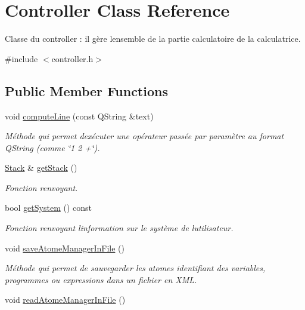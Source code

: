 \hypertarget{class_controller}{}\section{Controller Class Reference}
\label{class_controller}


Classe du controller \+: il gère l\textquotesingle{}ensemble de la partie calculatoire de la calculatrice.  




{\ttfamily \#include $<$controller.\+h$>$}

\subsection*{Public Member Functions}
\begin{DoxyCompactItemize}
\item 
void \hyperlink{class_controller_aeafe263fdc6988f7048348336963af3b}{compute\+Line} (const Q\+String \&text)
\begin{DoxyCompactList}\small\item\em Méthode qui permet d\textquotesingle{}exécuter une opérateur passée par paramètre au format Q\+String (comme \char`\"{}1 2 +\char`\"{}). \end{DoxyCompactList}\item 
\hyperlink{class_stack}{Stack} \& \hyperlink{class_controller_a7d6b52df03700a11e2f32d182672c835}{get\+Stack} ()
\begin{DoxyCompactList}\small\item\em Fonction renvoyant. \end{DoxyCompactList}\item 
bool \hyperlink{class_controller_a575555321b64dfec43e5fca3110cd54c}{get\+System} () const 
\begin{DoxyCompactList}\small\item\em Fonction renvoyant l\textquotesingle{}information sur le système de l\textquotesingle{}utilisateur. \end{DoxyCompactList}\item 
void \hyperlink{class_controller_a0f78112f0aaba5bc57f7c0cfdbdd8195}{save\+Atome\+Manager\+In\+File} ()\hypertarget{class_controller_a0f78112f0aaba5bc57f7c0cfdbdd8195}{}\label{class_controller_a0f78112f0aaba5bc57f7c0cfdbdd8195}

\begin{DoxyCompactList}\small\item\em Méthode qui permet de sauvegarder les atomes identifiant des variables, programmes ou expressions dans un fichier en X\+ML. \end{DoxyCompactList}\item 
void \hyperlink{class_controller_ae522d9720b5eb7f97f559083697f9bad}{read\+Atome\+Manager\+In\+File} ()\hypertarget{class_controller_ae522d9720b5eb7f97f559083697f9bad}{}\label{class_controller_ae522d9720b5eb7f97f559083697f9bad}


\end{DoxyCompactItemize}
